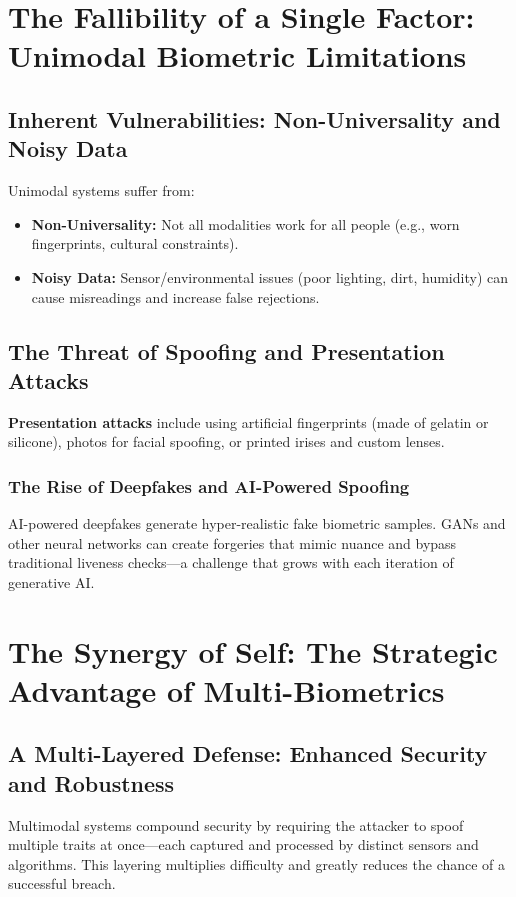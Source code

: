 \section{The Fallibility of a Single Factor: Unimodal Biometric Limitations}

\subsection{Inherent Vulnerabilities: Non-Universality and Noisy Data}
Unimodal systems suffer from:
\begin{itemize}
    \item \textbf{Non-Universality:} Not all modalities work for all people (e.g., worn fingerprints, cultural constraints).
    \item \textbf{Noisy Data:} Sensor/environmental issues (poor lighting, dirt, humidity) can cause misreadings and increase false rejections.
\end{itemize}

\subsection{The Threat of Spoofing and Presentation Attacks}
\textbf{Presentation attacks} include using artificial fingerprints (made of gelatin or silicone), photos for facial spoofing, or printed irises and custom lenses.

\subsubsection{The Rise of Deepfakes and AI-Powered Spoofing}
AI-powered deepfakes generate hyper-realistic fake biometric samples. GANs and other neural networks can create forgeries that mimic nuance and bypass traditional liveness checks—a challenge that grows with each iteration of generative AI.

\section{The Synergy of Self: The Strategic Advantage of Multi-Biometrics}

\subsection{A Multi-Layered Defense: Enhanced Security and Robustness}
Multimodal systems compound security by requiring the attacker to spoof multiple traits at once—each captured and processed by distinct sensors and algorithms. This layering multiplies difficulty and greatly reduces the chance of a successful breach.

